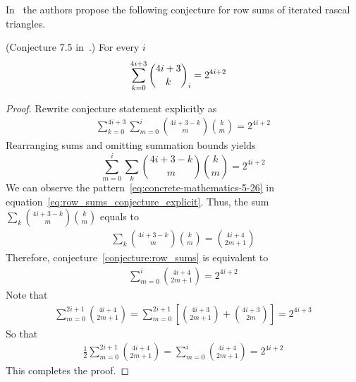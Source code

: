 ﻿In~\cite{gregory2023iterated_Aequationes} the authors
propose the following conjecture for row sums of iterated rascal triangles.
\begin{conj}
    \label{conjecture:row_sums}
    (Conjecture 7.5 in~\cite{gregory2023iterated_Aequationes}.)
    For every $i$
    \begin{align*}
        \sum_{k=0}^{4i+3} \binom{4i+3}{k}_{i} &= 2^{4i+2}
    \end{align*}
\end{conj}
\begin{proof}
    Rewrite conjecture statement explicitly as
    \begin{align*}
        \sum_{k=0}^{4i+3} \sum_{m=0}^{i} \binom{4i+3-k}{m} \binom{k}{m} = 2^{4i+2}
    \end{align*}
    Rearranging sums and omitting summation bounds yields
    \begin{equation}
        \sum_{m=0}^{i}  \sum_{k} \binom{4i+3-k}{m} \binom{k}{m} = 2^{4i+2}\label{eq:row_sums_conjecture_explicit}
    \end{equation}
    We can observe the pattern~\eqref{eq:concrete-mathematics-5-26}
    in equation~\eqref{eq:row_sums_conjecture_explicit}.
    Thus, the sum $\sum_{k} \binom{4i+3-k}{m} \binom{k}{m}$ equals to
    \begin{align*}
        \sum_{k} \binom{4i+3-k}{m} \binom{k}{m} = \binom{4i+4}{2m+1}
    \end{align*}
    Therefore, conjecture~\eqref{conjecture:row_sums} is equivalent to
    \begin{align*}
        \sum_{m=0}^{i} \binom{4i+4}{2m+1} = 2^{4i+2}
    \end{align*}
    Note that
    \begin{align*}
        \sum_{m=0}^{2i+1} \binom{4i+4}{2m+1}= \sum_{m=0}^{2i+1} \left[ \binom{4i+3}{2m+1} + \binom{4i+3}{2m} \right] = 2^{4i+3}
    \end{align*}
    So that
    \begin{align*}
        \frac{1}{2} \sum_{m=0}^{2i+1} \binom{4i+4}{2m+1} = \sum_{m=0}^{i} \binom{4i+4}{2m+1} = 2^{4i+2}
    \end{align*}
    This completes the proof.
\end{proof}
